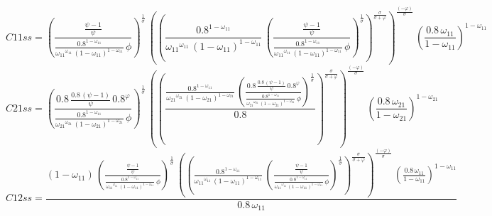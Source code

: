 \begin{dmath*}
C11ss = \left(\frac{\frac{{{\psi}}-1}{{{\psi}}}}{\frac{0.8^{1-{{\omega_{11}}}}}{{{\omega_{11}}}^{{{\omega_{11}}}}\, \left(1-{{\omega_{11}}}\right)^{1-{{\omega_{11}}}}}\, {{\phi}}}\right)^{\frac{1}{{{\sigma}}}}\, \left(\left(\frac{0.8^{1-{{\omega_{11}}}}}{{{\omega_{11}}}^{{{\omega_{11}}}}\, \left(1-{{\omega_{11}}}\right)^{1-{{\omega_{11}}}}}\, \left(\frac{\frac{{{\psi}}-1}{{{\psi}}}}{\frac{0.8^{1-{{\omega_{11}}}}}{{{\omega_{11}}}^{{{\omega_{11}}}}\, \left(1-{{\omega_{11}}}\right)^{1-{{\omega_{11}}}}}\, {{\phi}}}\right)^{\frac{1}{{{\sigma}}}}\right)^{\frac{{{\sigma}}}{{{\sigma}}+{{\varphi}}}}\right)^{\frac{\left(-{{\varphi}}\right)}{{{\sigma}}}}\, \left(\frac{0.8\, {{\omega_{11}}}}{1-{{\omega_{11}}}}\right)^{1-{{\omega_{11}}}}
\end{dmath*}
\begin{dmath*}
C21ss = \left(\frac{0.8\, \frac{0.8\, \left({{\psi}}-1\right)}{{{\psi}}}\, 0.8^{{{\varphi}}}}{\frac{0.8^{1-{{\omega_{11}}}}}{{{\omega_{21}}}^{{{\omega_{21}}}}\, \left(1-{{\omega_{21}}}\right)^{1-{{\omega_{21}}}}}\, {{\phi}}}\right)^{\frac{1}{{{\sigma}}}}\, \left(\left(\frac{\frac{0.8^{1-{{\omega_{11}}}}}{{{\omega_{21}}}^{{{\omega_{21}}}}\, \left(1-{{\omega_{21}}}\right)^{1-{{\omega_{21}}}}}\, \left(\frac{0.8\, \frac{0.8\, \left({{\psi}}-1\right)}{{{\psi}}}\, 0.8^{{{\varphi}}}}{\frac{0.8^{1-{{\omega_{11}}}}}{{{\omega_{21}}}^{{{\omega_{21}}}}\, \left(1-{{\omega_{21}}}\right)^{1-{{\omega_{21}}}}}\, {{\phi}}}\right)^{\frac{1}{{{\sigma}}}}}{0.8}\right)^{\frac{{{\sigma}}}{{{\sigma}}+{{\varphi}}}}\right)^{\frac{\left(-{{\varphi}}\right)}{{{\sigma}}}}\, \left(\frac{0.8\, {{\omega_{21}}}}{1-{{\omega_{21}}}}\right)^{1-{{\omega_{21}}}}
\end{dmath*}
\begin{dmath*}
C12ss = \frac{\left(1-{{\omega_{11}}}\right)\, \left(\frac{\frac{{{\psi}}-1}{{{\psi}}}}{\frac{0.8^{1-{{\omega_{11}}}}}{{{\omega_{11}}}^{{{\omega_{11}}}}\, \left(1-{{\omega_{11}}}\right)^{1-{{\omega_{11}}}}}\, {{\phi}}}\right)^{\frac{1}{{{\sigma}}}}\, \left(\left(\frac{0.8^{1-{{\omega_{11}}}}}{{{\omega_{11}}}^{{{\omega_{11}}}}\, \left(1-{{\omega_{11}}}\right)^{1-{{\omega_{11}}}}}\, \left(\frac{\frac{{{\psi}}-1}{{{\psi}}}}{\frac{0.8^{1-{{\omega_{11}}}}}{{{\omega_{11}}}^{{{\omega_{11}}}}\, \left(1-{{\omega_{11}}}\right)^{1-{{\omega_{11}}}}}\, {{\phi}}}\right)^{\frac{1}{{{\sigma}}}}\right)^{\frac{{{\sigma}}}{{{\sigma}}+{{\varphi}}}}\right)^{\frac{\left(-{{\varphi}}\right)}{{{\sigma}}}}\, \left(\frac{0.8\, {{\omega_{11}}}}{1-{{\omega_{11}}}}\right)^{1-{{\omega_{11}}}}}{0.8\, {{\omega_{11}}}}
\end{dmath*}
